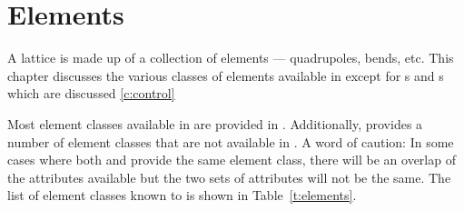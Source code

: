 \chapter{Elements}
\label{c:elements}

A lattice is made up of a collection of elements --- quadrupoles,
bends, etc. This chapter discusses the various classes of elements
available in \bmad except for s and s which are
discussed \cref{c:control}

Most element classes available in \mad are provided in \bmad.
Additionally, \bmad provides a number of element classes that are not
available in \mad.  A word of caution: In some cases where both \mad
and \bmad provide the same element class, there will be an overlap of 
the attributes available but the two sets of attributes will not be the same.
The list of element classes known to \bmad is shown in Table~\ref{t:elements}.

